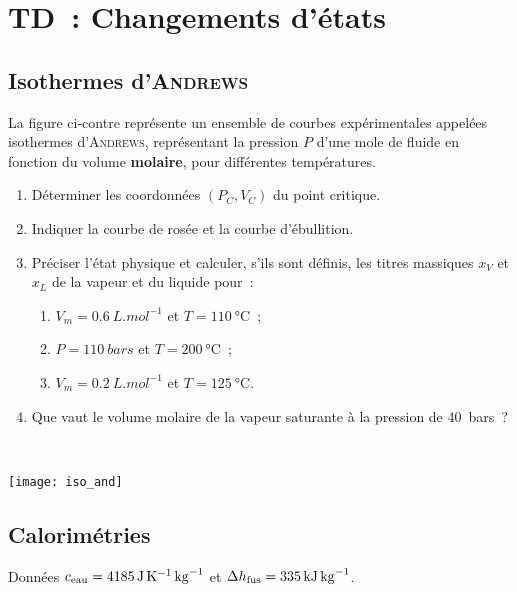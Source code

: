 \documentclass[a4paper, 10pt, final, garamond]{book}
\begin{document}
\setcounter{chapter}{3}

\chapter{TD~: Changements d'\'etats}

\section{Isothermes d'\textsc{Andrews}}

\begin{minipage}[t]{.60\linewidth}
  La figure ci-contre représente un ensemble de courbes expérimentales appelées
  isothermes d'\textsc{Andrews}, représentant la pression $P$ d'une mole de
  fluide en fonction du volume \textbf{molaire}, pour différentes températures.
  \smallbreak
  \begin{enumerate}
    \item Déterminer les coordonnées $(P_C,V_C)$ du point critique.
    \item Indiquer la courbe de rosée et la courbe d'ébullition.
    \item Préciser l'état physique et calculer, s'ils sont définis, les titres
      massiques $x_V$ et $x_L$ de la vapeur et du liquide pour~:
      \begin{enumerate}
        \item $V_m = \SI{0.6}{L.mol^{-1}}$ et $T = \SI{110}{\degreeCelsius}$~;
        \item $P = \SI{110}{bars}$ et $T = \SI{200}{\degreeCelsius}$~;
        \item $V_m = \SI{0.2}{L.mol^{-1}}$ et $T = \SI{125}{\degreeCelsius}$.
      \end{enumerate}
    \item Que vaut le volume molaire de la vapeur saturante à la pression de
      \SI{40}{bars}~?
  \end{enumerate}
\end{minipage}
\begin{minipage}[t]{.40\linewidth}
  ~
  \vspace*{-10pt}
  \begin{center}
    \texttt{[image: iso\_and]}
    \label{fig:isoand}
  \end{center}
\end{minipage}

\section{Calorimétries}
\begin{rdefi}{Données}
  $c_{\rm eau} = \SI{4185}{J.K^{-1}.kg^{-1}}$ et $\Delta{h_{\rm fus}} =
  \SI{335}{kJ.kg^{-1}}$.
\end{rdefi}
\end{document}
